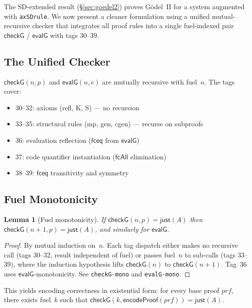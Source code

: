 \documentclass[11pt]{article}
\newtheorem{lemma}[theorem]{Lemma}
\newcommand{\fceq}{\mathsf{fceq}}
\newcommand{\fcAll}{\mathsf{fcAll}}
\begin{document}
The SD-extended result (\S\ref{sec:goedel2}) proves G\"odel~II for
a system augmented with \texttt{axSDrule}. We now present a cleaner
formulation using a unified mutual-recursive checker that integrates
all proof rules into a single fuel-indexed pair $\mathsf{checkG}$
/ $\mathsf{evalG}$ with tags 30--39.

\subsection{The Unified Checker}

$\mathsf{checkG}(n, p)$ and $\mathsf{evalG}(n, e)$ are mutually
recursive with fuel~$n$. The tags cover:
\begin{itemize}[nosep]
\item 30--32: axioms (refl, K, S) --- no recursion
\item 33--35: structural rules (mp, gen, cgen) --- recurse on subproofs
\item 36: evaluation reflection ($\fceq$ from $\mathsf{evalG}$)
\item 37: code quantifier instantiation ($\fcAll$ elimination)
\item 38--39: $\fceq$ transitivity and symmetry
\end{itemize}

\subsection{Fuel Monotonicity}

\begin{lemma}[Fuel monotonicity]
  If\/ $\mathsf{checkG}(n, p) = \mathsf{just}(A)$ then
  $\mathsf{checkG}(n{+}1, p) = \mathsf{just}(A)$,
  and similarly for $\mathsf{evalG}$.
\end{lemma}

\begin{proof}
  By mutual induction on~$n$. Each tag dispatch either makes no
  recursive call (tags 30--32, result independent of fuel) or
  passes fuel~$n$ to sub-calls (tags 33--39), where the induction
  hypothesis lifts $\mathsf{checkG}(n)$ to $\mathsf{checkG}(n{+}1)$.
  Tag~36 uses $\mathsf{evalG}$-monotonicity.
  See \texttt{checkG-mono} and \texttt{evalG-mono}.
\end{proof}

This yields encoding correctness in existential form:
for every base proof $\mathit{prf}$, there exists fuel~$k$ such that
$\mathsf{checkG}(k, \mathsf{encodeProof}(\mathit{prf})) =
\mathsf{just}(A)$.
\end{document}

